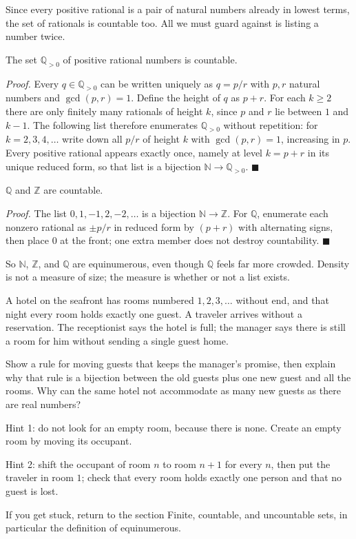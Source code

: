 Since every positive rational is a pair of natural numbers already in lowest terms,
the set of rationals is countable too. All we must guard against is listing a number
twice.

\begin{proposisi}
The set $\mathbb{Q}_{>0}$ of positive rational numbers is countable.
\end{proposisi}
\par\smallskip\noindent\textit{Proof.} Every $q \in \mathbb{Q}_{>0}$ can be written
uniquely as $q = p/r$ with $p, r$ natural numbers and $\gcd(p,r) = 1$. Define the
height of $q$ as $p + r$. For each $k \ge 2$ there are only finitely many rationals of
height $k$, since $p$ and $r$ lie between $1$ and $k-1$. The following list therefore
enumerates $\mathbb{Q}_{>0}$ without repetition: for $k = 2, 3, 4, \dots$ write down
all $p/r$ of height $k$ with $\gcd(p,r) = 1$, increasing in $p$. Every positive
rational appears exactly once, namely at level $k = p + r$ in its unique reduced form,
so that list is a bijection $\mathbb{N} \to \mathbb{Q}_{>0}$.
\hfill$\blacksquare${\parfillskip=0pt\par}

\begin{akibat}
$\mathbb{Q}$ and $\mathbb{Z}$ are countable.
\end{akibat}
\par\smallskip\noindent\textit{Proof.} The list $0, 1, -1, 2, -2, \dots$ is a
bijection $\mathbb{N} \to \mathbb{Z}$. For $\mathbb{Q}$, enumerate each nonzero
rational as $\pm p/r$ in reduced form by $(p+r)$ with alternating signs, then place
$0$ at the front; one extra member does not destroy countability.
\hfill$\blacksquare${\parfillskip=0pt\par}

So $\mathbb{N}$, $\mathbb{Z}$, and $\mathbb{Q}$ are equinumerous, even though
$\mathbb{Q}$ feels far more crowded. Density is not a measure of size; the measure is
whether or not a list exists.

\begin{tantangan}
A hotel on the seafront has rooms numbered $1, 2, 3, \dots$ without end, and that
night every room holds exactly one guest. A traveler arrives without a reservation.
The receptionist says the hotel is full; the manager says there is still a room for
him without sending a single guest home.

Show a rule for moving guests that keeps the manager's promise, then explain why that
rule is a bijection between the old guests plus one new guest and all the rooms. Why
can the same hotel not accommodate as many new guests as there are real numbers?

Hint 1: do not look for an empty room, because there is none. Create an empty room by
moving its occupant.

Hint 2: shift the occupant of room $n$ to room $n+1$ for every $n$, then put the
traveler in room $1$; check that every room holds exactly one person and that no
guest is lost.

If you get stuck, return to the section Finite, countable, and uncountable sets, in
particular the definition of equinumerous.
\end{tantangan}

